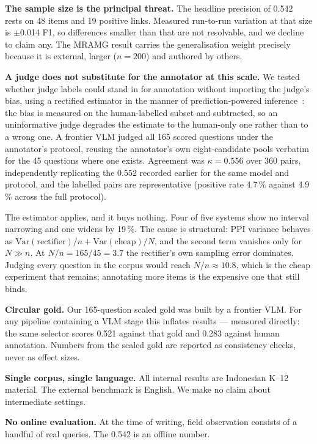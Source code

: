\documentclass[journal]{IEEEtran}
\begin{document}
\textbf{The sample size is the principal threat.} The headline precision of 0.542
rests on 48 items and 19 positive links. Measured run-to-run variation at that size
is $\pm$0.014 F1, so differences smaller than that are not resolvable, and we
decline to claim any. The MRAMG result carries the generalisation weight precisely
because it is external, larger ($n = 200$) and authored by others.

\textbf{A judge does not substitute for the annotator at this scale.} We tested
whether judge labels could stand in for annotation without importing the judge's
bias, using a rectified estimator in the manner of prediction-powered
inference~\cite{ares}: the bias is measured on the human-labelled subset and
subtracted, so an uninformative judge degrades the estimate to the human-only one
rather than to a wrong one. A frontier VLM judged all 165 scored questions under
the annotator's protocol, reusing the annotator's own eight-candidate pools
verbatim for the 45 questions where one exists. Agreement was $\kappa = 0.556$
over 360 pairs, independently replicating the 0.552 recorded earlier for the same
model and protocol, and the labelled pairs are representative (positive rate
4.7\,\% against 4.9\,\% across the full protocol).

The estimator applies, and it buys nothing. Four of five systems show no interval
narrowing and one widens by 19\,\%. The cause is structural: PPI variance behaves
as $\mathrm{Var}(\text{rectifier})/n + \mathrm{Var}(\text{cheap})/N$, and the
second term vanishes only for $N \gg n$. At $N/n = 165/45 = 3.7$ the rectifier's
own sampling error dominates. Judging every question in the corpus would reach
$N/n \approx 10.8$, which is the cheap experiment that remains; annotating more
items is the expensive one that still binds.

\textbf{Circular gold.} Our 165-question scaled gold was built by a frontier VLM.
For any pipeline containing a VLM stage this inflates results --- measured
directly: the same selector scores 0.521 against that gold and 0.283 against
human annotation. Numbers from the scaled gold are reported as consistency checks,
never as effect sizes.

\textbf{Single corpus, single language.} All internal results are Indonesian K--12
material. The external benchmark is English. We make no claim about intermediate
settings.

\textbf{No online evaluation.} At the time of writing, field observation consists
of a handful of real queries. The 0.542 is an offline number.
\end{document}
